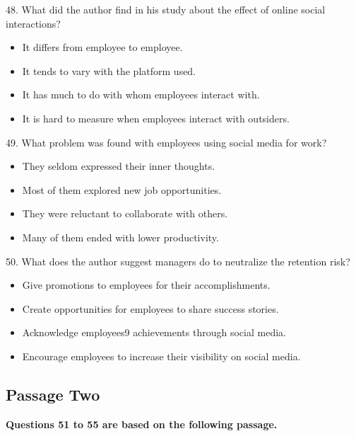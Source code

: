\documentclass[UTF8,11pt]{ctexart}
\begin{document}
48. What did the author find in his study about the effect of online social interactions?


\begin{itemize}[leftmargin=2em,itemsep=.2em,topsep=.4em]\item[A.] It differs from employee to employee.
\item[B.] It tends to vary with the platform used.
\item[C.] It has much to do with whom employees interact with.
\item[D.] It is hard to measure when employees interact with outsiders.
\end{itemize}

49. What problem was found with employees using social media for work?


\begin{itemize}[leftmargin=2em,itemsep=.2em,topsep=.4em]\item[A.] They seldom expressed their inner thoughts.
\item[B.] Most of them explored new job opportunities.
\item[C.] They were reluctant to collaborate with others.
\item[D.] Many of them ended with lower productivity.
\end{itemize}

50. What does the author suggest managers do to neutralize the retention risk?


\begin{itemize}[leftmargin=2em,itemsep=.2em,topsep=.4em]\item[A.] Give promotions to employees for their accomplishments.
\end{itemize}

\begin{itemize}[leftmargin=2em,itemsep=.2em,topsep=.4em]\item[B.] Create opportunities for employees to share success stories.
\item[C.] Acknowledge employees9 achievements through social media.
\item[D.] Encourage employees to increase their visibility on social media.
\end{itemize}

\subsection*{\textbf{Passage Two}}


\textbf{Questions 51 to 55 are based on the following passage.}
\end{document}
